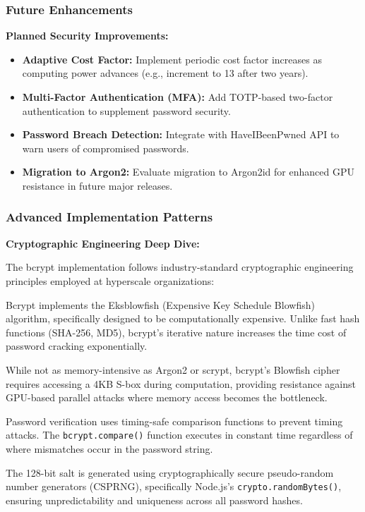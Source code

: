 \documentclass[12pt,a4paper]{article}
\begin{document}
\subsubsection{Future Enhancements}

\textbf{Planned Security Improvements:}

\begin{itemize}[leftmargin=2em, itemsep=6pt]
    \item \textbf{Adaptive Cost Factor:} Implement periodic cost factor increases as computing power advances (e.g., increment to 13 after two years).
    \item \textbf{Multi-Factor Authentication (MFA):} Add TOTP-based two-factor authentication to supplement password security.
    \item \textbf{Password Breach Detection:} Integrate with HaveIBeenPwned API to warn users of compromised passwords.
    \item \textbf{Migration to Argon2:} Evaluate migration to Argon2id for enhanced GPU resistance in future major releases.
\end{itemize}

\subsubsection{Advanced Implementation Patterns}

\textbf{Cryptographic Engineering Deep Dive:}

The bcrypt implementation follows industry-standard cryptographic engineering principles employed at hyperscale organizations:

\begin{description}[leftmargin=2em, itemsep=8pt, style=nextline]
    \item[\textbf{Key Stretching Mechanics:}] Bcrypt implements the Eksblowfish (Expensive Key Schedule Blowfish) algorithm, specifically designed to be computationally expensive. Unlike fast hash functions (SHA-256, MD5), bcrypt's iterative nature increases the time cost of password cracking exponentially.
    
    \item[\textbf{Memory-Hard Properties:}] While not as memory-intensive as Argon2 or scrypt, bcrypt's Blowfish cipher requires accessing a 4KB S-box during computation, providing resistance against GPU-based parallel attacks where memory access becomes the bottleneck.
    
    \item[\textbf{Constant-Time Comparison:}] Password verification uses timing-safe comparison functions to prevent timing attacks. The \texttt{bcrypt.compare()} function executes in constant time regardless of where mismatches occur in the password string.
    
    \item[\textbf{Salt Generation Entropy:}] The 128-bit salt is generated using cryptographically secure pseudo-random number generators (CSPRNG), specifically Node.js's \texttt{crypto.randomBytes()}, ensuring unpredictability and uniqueness across all password hashes.
\end{description}
\end{document}
